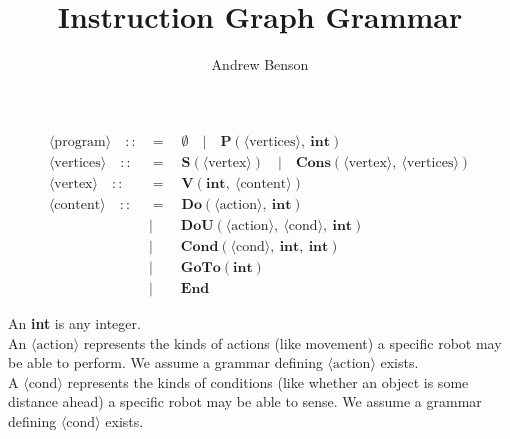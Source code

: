\documentclass[12pt]{article}
\title{Instruction Graph Grammar}
\author{Andrew Benson}
\date{}
\newcommand{\nonterm}[1]{\langle\text{#1}\rangle}
\newcommand{\term}[1]{\textbf{#1}}
\begin{document}
\maketitle

\begin{align*}
  \nonterm{program}\quad ::&=\quad \term{$\emptyset$}\quad
                            |\quad \term{P}(\nonterm{vertices},\ \term{int})\\
  \nonterm{vertices}\quad ::&=\quad \term{S}(\nonterm{vertex})\quad
                             |\quad \term{Cons}(\nonterm{vertex},\
                                                \nonterm{vertices})\\
  \nonterm{vertex}\quad ::&=\quad \term{V}(\term{int},\ \nonterm{content})\\
  \nonterm{content}\quad ::&=\quad
                      \term{Do}(\nonterm{action},\ \term{int})\quad\\
             &|\qquad \term{DoU}(\nonterm{action},\
                                     \nonterm{cond},\ \term{int})\\
             &|\qquad \term{Cond}(\nonterm{cond},\ \term{int},\ \term{int})\\
             &|\qquad \term{GoTo}(\term{int})\\
             &|\qquad \term{End}
\end{align*}

An \term{int} is any integer.\\

An $\nonterm{action}$ represents the kinds of actions (like movement) a specific
robot may be able to perform. We assume a grammar defining $\nonterm{action}$
exists.\\

A $\nonterm{cond}$ represents the kinds of conditions (like whether an object is
some distance ahead) a specific robot may be able to sense. We assume a grammar
defining $\nonterm{cond}$ exists.\\
\end{document}
